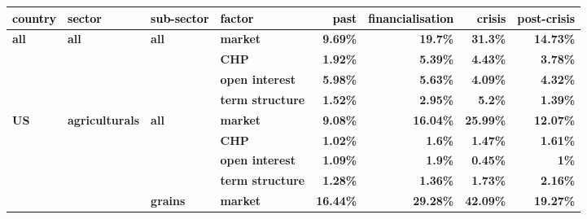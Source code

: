 \documentclass[
  authoryear,
  preprint,
  3p]{elsarticle}
\begin{document}
\begin{longtable}[t]{>{}l>{}l>{}l>{}l>{}r>{}r>{}r>{}r}
\toprule
\textcolor{black}{\textbf{country}} & \textcolor{black}{\textbf{sector}} & \textcolor{black}{\textbf{sub-sector}} & \textcolor{black}{\textbf{factor}} & \textcolor{black}{\textbf{past}} & \textcolor{black}{\textbf{financialisation}} & \textcolor{black}{\textbf{crisis}} & \textcolor{black}{\textbf{post-crisis}}\\
\midrule
\textbf{all} & \textbf{all} & \textbf{all} & \textbf{market} & \textcolor[HTML]{4285f4}{\textbf{9.69\%}} & \textcolor[HTML]{4285f4}{\textbf{19.7\%}} & \textcolor[HTML]{4285f4}{\textbf{31.3\%}} & \textcolor[HTML]{4285f4}{\textbf{14.73\%}}\\
\textbf{} & \textbf{} & \textbf{} & \textbf{CHP} & \textcolor[HTML]{4285f4}{\textbf{1.92\%}} & \textcolor[HTML]{4285f4}{\textbf{5.39\%}} & \textcolor[HTML]{4285f4}{\textbf{4.43\%}} & \textcolor[HTML]{4285f4}{\textbf{3.78\%}}\\
\textbf{} & \textbf{} & \textbf{} & \textbf{open interest} & \textcolor[HTML]{4285f4}{\textbf{5.98\%}} & \textcolor[HTML]{4285f4}{\textbf{5.63\%}} & \textcolor[HTML]{4285f4}{\textbf{4.09\%}} & \textcolor[HTML]{4285f4}{\textbf{4.32\%}}\\
\textbf{} & \textbf{} & \textbf{} & \textbf{term structure} & \textcolor[HTML]{4285f4}{\textbf{1.52\%}} & \textcolor[HTML]{4285f4}{\textbf{2.95\%}} & \textcolor[HTML]{4285f4}{\textbf{5.2\%}} & \textcolor[HTML]{4285f4}{\textbf{1.39\%}}\\
\textbf{US} & \textbf{agriculturals} & \textbf{all} & \textbf{market} & \textcolor[HTML]{4285f4}{\textbf{9.08\%}} & \textcolor[HTML]{4285f4}{\textbf{16.04\%}} & \textcolor[HTML]{4285f4}{\textbf{25.99\%}} & \textcolor[HTML]{4285f4}{\textbf{12.07\%}}\\
\addlinespace
\textbf{} & \textbf{} & \textbf{} & \textbf{CHP} & \textcolor[HTML]{4285f4}{\textbf{1.02\%}} & \textcolor[HTML]{4285f4}{\textbf{1.6\%}} & \textcolor[HTML]{4285f4}{\textbf{1.47\%}} & \textcolor[HTML]{4285f4}{\textbf{1.61\%}}\\
\textbf{} & \textbf{} & \textbf{} & \textbf{open interest} & \textcolor[HTML]{4285f4}{\textbf{1.09\%}} & \textcolor[HTML]{4285f4}{\textbf{1.9\%}} & \textcolor[HTML]{4285f4}{\textbf{0.45\%}} & \textcolor[HTML]{4285f4}{\textbf{1\%}}\\
\textbf{} & \textbf{} & \textbf{} & \textbf{term structure} & \textcolor[HTML]{4285f4}{\textbf{1.28\%}} & \textcolor[HTML]{4285f4}{\textbf{1.36\%}} & \textcolor[HTML]{4285f4}{\textbf{1.73\%}} & \textcolor[HTML]{4285f4}{\textbf{2.16\%}}\\
\textbf{} & \textbf{} & \textbf{grains} & \textbf{market} & \textcolor[HTML]{4285f4}{\textbf{16.44\%}} & \textcolor[HTML]{4285f4}{\textbf{29.28\%}} & \textcolor[HTML]{4285f4}{\textbf{42.09\%}} & \textcolor[HTML]{4285f4}{\textbf{19.27\%}}\\

\end{longtable}
\end{document}
